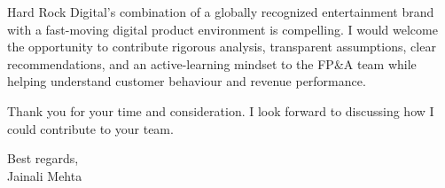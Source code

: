 \documentclass[letterpaper,11pt]{article}
\begin{document}
\bigbreak
Hard Rock Digital's combination of a globally recognized entertainment brand with a fast-moving digital product environment is compelling. I would welcome the opportunity to contribute rigorous analysis, transparent assumptions, clear recommendations, and an active-learning mindset to the FP\&A team while helping understand customer behaviour and revenue performance.

\bigbreak
Thank you for your time and consideration. I look forward to discussing how I could contribute to your team.

\bigbreak
Best regards,\\
Jainali Mehta
\end{document}
